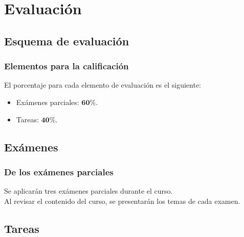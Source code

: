 \documentclass[12pt]{beamer}
\begin{document}
\section{Evaluación}
\subsection{Esquema de evaluación}

\begin{frame}
\frametitle{Elementos para la calificación}
El porcentaje para cada elemento de evaluación es el siguiente:
\pause
\begin{itemize}[<+->]
\setlength{\itemsep}{0mm}
\item Exámenes parciales: $\mathbf{60\%}$.
\item Tareas: $\mathbf{40\%}$.
\end{itemize}
\end{frame}

\subsection{Exámenes}

\begin{frame}
\frametitle{De los exámenes parciales}
Se aplicarán tres exámenes parciales durante el curso.
\\
\bigskip
Al revisar el contenido del curso, se presentarán los temas de cada examen.
\end{frame}

\subsection{Tareas}
\end{document}
